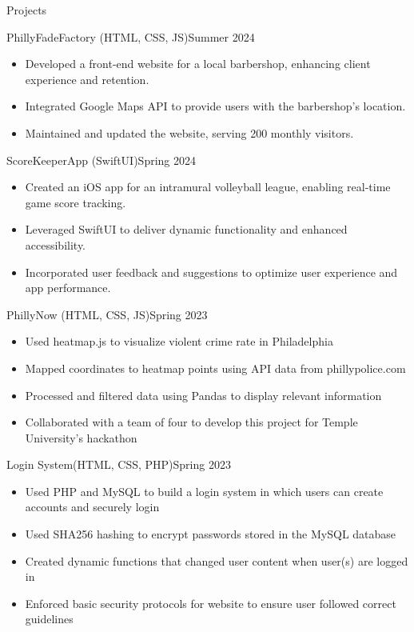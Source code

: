 \documentclass[]{mcdowellcv}
\begin{document}
	\makeheader
	
	\begin{cvsection}{Projects}
		\begin{cvsubsection}{PhillyFadeFactory (HTML, CSS, JS)}{}{Summer 2024}
			\begin{itemize}
				\item Developed a front-end website for a local barbershop, enhancing client experience and retention.
				\item Integrated Google Maps API to provide users with the barbershop's location.
				\item Maintained and updated the website, serving 200 monthly visitors.
			\end{itemize}
		\end{cvsubsection}

		\begin{cvsubsection}{ScoreKeeperApp (SwiftUI)}{}{Spring 2024}
			\begin{itemize}
				\item Created an iOS app for an intramural volleyball league, enabling real-time game score tracking.
				\item Leveraged SwiftUI to deliver dynamic functionality and enhanced accessibility.
				\item Incorporated user feedback and suggestions to optimize user experience and app performance.
			\end{itemize}
		\end{cvsubsection}

		\begin{cvsubsection}{PhillyNow (HTML, CSS, JS)}{}{Spring 2023}
			\begin{itemize}
				\item Used heatmap.js to visualize violent crime rate in Philadelphia
				\item Mapped coordinates to heatmap points using API data from phillypolice.com
				\item Processed and filtered data using Pandas to display relevant information
				\item Collaborated with a team of four to develop this project for Temple University's hackathon
			\end{itemize}
		\end{cvsubsection}

		\begin{cvsubsection}{Login System(HTML, CSS, PHP)}{}{Spring 2023}
			\begin{itemize}
				\item Used PHP and MySQL to build a login system in which users can create accounts and securely login
				\item Used SHA256 hashing to encrypt passwords stored in the MySQL database
				\item Created dynamic functions that changed user content when user(s) are logged in
				\item Enforced basic security protocols for website to ensure user followed correct guidelines
			\end{itemize}
		\end{cvsubsection}
	\end{cvsection}
\end{document}
